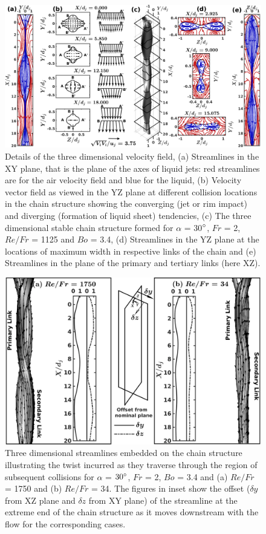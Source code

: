 \documentclass{jfm}
\begin{document}
\clearpage
\begin{figure}
	\centering
	\includegraphics[width=\linewidth]{streamlinesDetails}
	\caption{Details of the three dimensional velocity field, (a) Streamlines in the XY plane, that is the plane of the axes of liquid jets: red streamlines are for the air velocity field and blue for the liquid, (b) Velocity vector field as viewed in the YZ plane at different collision locations in the chain structure showing the converging (jet or rim impact) and diverging (formation of liquid sheet) tendencies, (c) The three dimensional stable chain structure formed for $\alpha$ = 30$\degree$, $Fr$ = 2,  $Re/Fr$ = 1125 and $Bo$ = 3.4, (d) Streamlines in the YZ plane at the locations of maximum width in respective links of the chain and (e) Streamlines in the plane of the primary and tertiary links (here XZ).}
	\label{Figure::streamDetails}
\end{figure}
\clearpage
\begin{figure}
	\centering
	\includegraphics[width=\linewidth]{fig1}
	\caption{Three dimensional streamlines embedded on the chain structure illustrating the twist incurred as they traverse through the region of subsequent collisions for $\alpha$ = $30\degree$, $Fr$ = 2, $Bo$ = 3.4 and (a) $Re/Fr$ = 1750 and (b) $Re/Fr$ = 34. The figures in inset show the offset ($\delta y$ from XZ plane and $\delta z$ from XY plane) of the streamline at the extreme end of the chain structure as it moves downstream with the flow for the corresponding cases.}
	\label{Figure::stream}
\end{figure}
\end{document}
